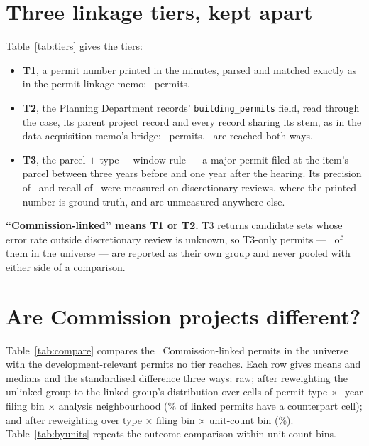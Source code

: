 \documentclass[11pt]{article}
\begin{document}
\section{Three linkage tiers, kept apart}

Table~\ref{tab:tiers} gives the tiers:

\begin{itemize}
\item \textbf{T1}, a permit number printed in the minutes, parsed and matched exactly as in the
permit-linkage memo: \pcTone\ permits.
\item \textbf{T2}, the Planning Department records' \texttt{building\_permits} field, read
through the case, its parent project record and every record sharing its stem, as in the
data-acquisition memo's bridge: \pcTtwo\ permits. \pcTboth\ are reached both ways.
\item \textbf{T3}, the parcel $+$ type $+$ window rule --- a major permit filed at the item's
parcel between three years before and one year after the hearing. Its precision of
\pcTthreePrecision\ and recall of \pcTthreeRecall\ were measured on discretionary reviews,
where the printed number is ground truth, and are unmeasured anywhere else.
\end{itemize}

\textbf{``Commission-linked'' means T1 or T2.} T3 returns candidate sets whose error rate outside
discretionary review is unknown, so T3-only permits --- \pcTthreeOnly\ of them in the universe
--- are reported as their own group and never pooled with either side of a comparison.

\section{Are Commission projects different?}

Table~\ref{tab:compare} compares the \pcLinked\ Commission-linked permits in the universe with
the development-relevant permits no tier reaches. Each row gives means and medians and the
standardised difference three ways: raw; after reweighting the unlinked group to the linked
group's distribution over cells of permit type $\times$ \pcYearBin-year filing bin $\times$
analysis neighbourhood (\pcSupportCells\% of linked permits have a counterpart cell); and after
reweighting over type $\times$ filing bin $\times$ unit-count bin (\pcSupportUnits\%).
Table~\ref{tab:byunits} repeats the outcome comparison within unit-count bins.
\end{document}
